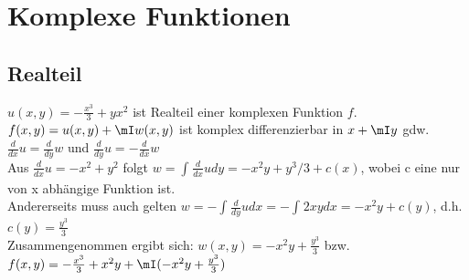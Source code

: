 
	\section{Komplexe Funktionen}

	\subsection{Realteil}
	$u(x,y)=-\frac{x^3}{3}+y x^2 $ ist Realteil einer komplexen Funktion $f$.\\
	$f(x,y)=u(x,y)+\mI w(x,y)$ ist komplex differenzierbar in $x+\mI y$ gdw. $\frac{d}{dx}u = \frac{d}{dy}w$ und $\frac{d}{dy}u = -\frac{d}{dx}w$\\
	Aus $\frac{d}{dx}u = -x^2+y^2$ folgt $w=\int_{}{} \frac{d}{dx} u dy =-x^2y+y^3/3+c(x)$, wobei c eine nur von x abhängige Funktion ist.\\
    Andererseits muss auch gelten $w=-\int_{}{} \frac{d}{dy} u dx= -\int_{}{} 2xy  dx =-x^2y+c(y)$, d.h. $c(y)=\frac{y^3}{3}$\\
	Zusammengenommen ergibt sich:
	    $w(x,y)=-x^2y+\frac{y^3}{3}$ bzw. $f(x,y)=-\frac{x^3}{3}+ x^2y +\mI(-x^2y+\frac{y^3}{3})$
